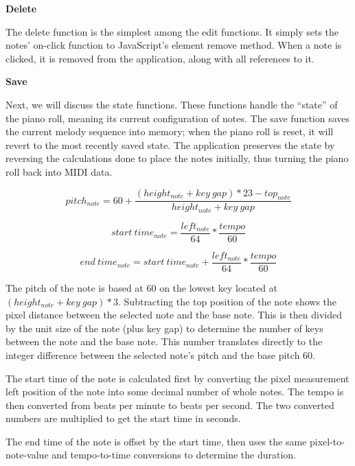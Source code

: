 \textbf{Delete}

The delete function is the simplest among the edit functions. It simply sets the notes’ on-click
function to JavaScript’s element remove method. When a note is clicked, it is removed from the
application, along with all references to it.

\textbf{Save}

Next, we will discuss the state functions. These functions handle the “state” of the piano roll,
meaning its current configuration of notes. The save function saves the current melody sequence
into memory; when the piano roll is reset, it will revert to the most recently saved state. The
application preserves the state by reversing the calculations done to place the notes initially,
thus turning the piano roll back into MIDI data.

\begin{equation} \label{get_pitch}
  pitch_{note} = 60 + \frac{(height_{note} + key\:gap) * 23 - top_{note}}{height_{note} + key\:gap}
\end{equation}

\begin{equation} \label{get_start}
  start\:time_{note} = \frac{left_{note}}{64} * \frac{tempo}{60}
\end{equation}

\begin{equation} \label{get_end}
  end\:time_{note} = start\:time_{note} + \frac{left_{note}}{64} * \frac{tempo}{60}
\end{equation}

The pitch of the note is based at 60 on the lowest key located at
$ (height_{note} +key\:gap) * 3 $. Subtracting the top position of the note shows the pixel
distance between the selected note and the base note. This is then divided by the unit size of the
note (plus key gap) to determine the number of keys between the note and the base note. This number
translates directly to the integer difference between the selected note’s pitch and the base pitch
60.

The start time of the note is calculated first by converting the pixel measurement left position
of the note into some decimal number of whole notes. The tempo is then converted from beats per
minute to beats per second. The two converted numbers are multiplied to get the start time in
seconds.

The end time of the note is offset by the start time, then uses the same pixel-to-note-value and
tempo-to-time conversions to determine the duration.


